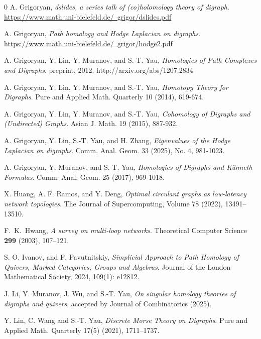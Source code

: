\documentclass[11pt]{amsart}
\theoremstyle{plain}
\theoremstyle{definition}
\numberwithin{equation}{section}
\begin{document}
\begin{thebibliography}{0}
 A. Grigoryan,
\textit{dslides, a series talk of (co)holomology theory of digraph}.
\href{dslides}{https://www.math.uni-bielefeld.de/~grigor/dslides.pdf}


 A. Grigoryan,
\textit{Path homology and Hodge Laplacian on digraphs}.
\href{dslides}{https://www.math.uni-bielefeld.de/~grigor/hodge2.pdf}



 A. Grigoryan, Y. Lin, Y. Muranov, and S.-T. Yau,
\textit{Homologies of Path Complexes and Digraphs}.
preprint, 2012. http://arxiv.org/abs/1207.2834


 A. Grigoryan, Y. Lin, Y. Muranov, and S.-T. Yau,
\textit{Homotopy Theory for Digraphs}.
Pure and Applied Math. Quarterly 10 (2014), 619-674.

 A. Grigoryan, Y. Lin, Y. Muranov, and S.-T. Yau,
\textit{Cohomology of Digraphs and (Undirected) Graphs}.
Asian J. Math. 19 (2015), 887-932.


 A. Grigoryan, Y. Lin, S.-T. Yau, and H. Zhang,
\textit{Eigenvalues of the Hodge Laplacian on digraphs}.
Comm. Anal. Geom. 33 (2025), No. 4, 981-1023.



 A. Grigoryan, Y. Muranov, and S.-T. Yau,
\textit{Homologies of Digraphs and K\"unneth Formulas}.
Comm. Anal. Geom. 25 (2017), 969-1018.


 X. Huang, A. F. Ramos, and Y. Deng,
\textit{Optimal circulant graphs as low-latency network topologies}.
The Journal of Supercomputing, Volume 78 (2022), 13491--13510.


F.~K.~Hwang,
\textit{A survey on multi-loop networks}.
Theoretical Computer Science \textbf{299} (2003), 107--121.


 S. O. Ivanov, and F. Pavutnitskiy,
\textit{Simplicial Approach to Path Homology of Quivers, Marked Categories, Groups and Algebras}.
Journal of the London Mathematical Society, 2024, 109(1): e12812.




 J. Li, Y. Muranov, J. Wu, and S.-T. Yau, 
\textit{On singular homology theories of digraphs and quivers}. accepted by Journal of Combinatorics (2025).


 Y. Lin, C. Wang and S.-T. Yau,
\textit{Discrete Morse Theory on Digraphs}.
Pure and Applied Math. Quarterly 17(5) (2021), 1711--1737.



\end{thebibliography}
\end{document}
